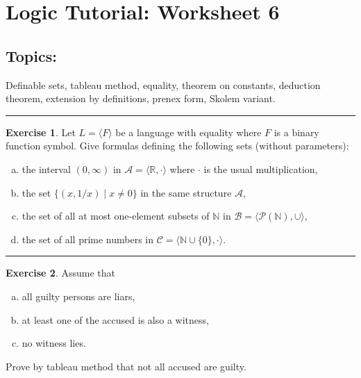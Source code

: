 \documentclass[11pt,a4paper]{amsart}
\theoremstyle{definition}
\newtheorem{problem}{Exercise}
\theoremstyle{remark}
\begin{document}
\section*{ Logic Tutorial: Worksheet 6}


\subsection*{Topics:} Definable sets, tableau method, equality, theorem on constants, deduction theorem, extension by definitions, prenex form, Skolem variant.

\smallskip
\hrule

\begin{problem}
Let $L=\langle F \rangle$ be a language with equality where $F$ is a binary function symbol. Give formulas defining the following sets (without parameters):
\begin{enumerate}[(a)]
\itemsep6pt
    \item the interval $(0,\infty)$ in $\mathcal A=\langle\mathbb R, \cdot\rangle$ where $\cdot$ is the usual multiplication,
    \item the set $\{(x, 1/x)\mid x\neq 0\}$ in the same structure $\mathcal A$,
    \item the set of all at most one-element subsets of $\mathbb N$ in $\mathcal B=\langle\mathcal P(\mathbb N),\cup\rangle$,
    \item the set of all prime numbers in $\mathcal C=\langle \mathbb N\cup\{0\}, \cdot\rangle$.
\end{enumerate}

\end{problem}



\smallskip
\hrule

\begin{problem}
Assume that
\begin{enumerate}[(a)]
\itemsep6pt
\item all guilty persons are liars,
\item at least one of the accused is also a witness,
\item no witness lies.
\end{enumerate}
Prove by tableau method that not all accused are guilty.
\end{problem} 

\smallskip
\end{document}

